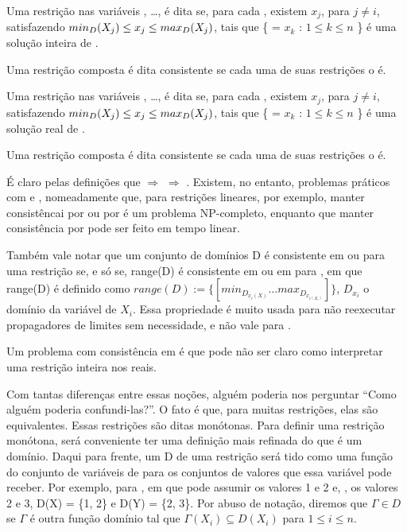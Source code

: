 \documentclass{article}
\begin{document}
\begin{definition}
  Uma restrição  nas variáveis , \dots,
   é dita  se, para cada
  , existem  $x_j$, para $j
  \neq i$, satisfazendo $min_D(\textit{$X_j$}) \leq x_j \leq
  max_D(\textit{$X_j$})$, tais que \{ = $x_k$ : $1 \leq k \leq
  n$ \} é uma solução inteira de .

  Uma restrição composta é dita \boundz{} consistente se cada uma de
  suas restrições o é.
\end{definition}

\begin{definition}
  Uma restrição  nas variáveis , \dots,
   é dita  se, para cada
  , existem  $x_j$, para $j \neq
  i$, satisfazendo $min_D(\textit{$X_j$}) \leq x_j \leq
  max_D(\textit{$X_j$})$, tais que \{ = $x_k$ : $1 \leq k \leq
  n$ \} é uma solução real de .

  Uma restrição composta é dita \boundr{} consistente se cada uma de
  suas restrições o é.
\end{definition}

É claro pelas definições que \boundd{} $\Rightarrow$ \boundz{}
$\Rightarrow$ \boundr. Existem, no entanto, problemas práticos com
\boundd{} e \boundz, nomeadamente que, para restrições lineares, por
exemplo, manter consistêncai por \boundd{} ou por \boundz{} é um
problema NP-completo, enquanto que manter consistência por \boundr{}
pode ser feito em tempo linear.

Também vale notar que um conjunto de domínios D é consistente em
\boundz{} ou \boundr{} para uma restrição  se, e só se,
range(D) é consistente em \boundz{} ou em \boundr{} para ,
em que range(D) é definido como $range(D) := \{[min_{D_{x_i(X)}} \ldots
  max_{D_{x_{i(X_i)}}}]\}$, $D_{x_i}$ o domínio da variável de 
$X_i$. Essa propriedade é muito usada para não reexecutar propagadores
de limites sem necessidade, e não vale para \boundd{}.

Um problema com consistência em \boundr{} é que pode não ser claro
como interpretar uma restrição inteira nos reais.

Com tantas diferenças entre essas noções, alguém poderia nos perguntar
``Como alguém poderia confundi-las?''. O fato é que, para muitas
restrições, elas são equivalentes. Essas restrições são ditas
monótonas. Para definir uma restrição monótona, será conveniente ter
uma definição mais refinada do que é um domínio. Daqui para frente, um
 D de uma restrição  será tido como uma
função do conjunto de variáveis de  para os conjuntos de
valores que essa variável pode receber. Por exemplo, para
, em que  pode assumir os valores 1 e
2 e, , os valores 2 e 3, D(X) = \{1, 2\} e D(Y) = \{2, 3\}. Por
abuso de notação, diremos que $\Gamma \in D$ se $\Gamma$ é outra
função domínio tal que $\Gamma(X_i) \subseteq D(X_i)$ para $1 \leq i
\leq n$.
\end{document}
